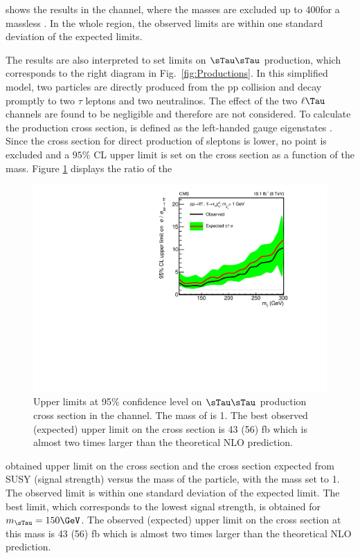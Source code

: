 shows the results in the \tauTau channel, where the \chione masses are excluded up to 400\GeV for a massless \PSGczDo. 
In the whole region, the observed limits are within one standard deviation of the expected limits.  

The results are also interpreted to set limits on $\sTau\sTau$ production, 
which corresponds to the right diagram in Fig.~\ref{fig:Productions}. 
In this simplified model, two \sTau particles are directly produced from the pp  collision and decay promptly to two $\tau$ leptons and two neutralinos. 
The effect of the two $\ell\Tau$ channels are found to be negligible and therefore are not considered.
To calculate the production cross section, \sTau is defined as the left-handed \sTau gauge eigenstates \cite{Fuks:2013lya}. 
Since the cross section for direct production of sleptons is lower, no point is excluded and a $95\%$ CL upper limit is set on 
the cross section  as a function of the \sTau mass. 
Figure \ref{fig:limit_stau_stau} displays the ratio of the 
\begin{linenomath}
\begin{figure}[!htb]
\centering
\includegraphics[width=1.0\textwidth,keepaspectratio=true]{StatisticsFig/ExclusionSTauSTauLsp1.pdf}
\caption{Upper limits at 95\% confidence level on $\sTau\sTau$ production cross section in the \tauTau channel. The mass of \PSGczDo is 1\GeV. 
The best observed (expected) upper limit on the cross section is 43 (56) fb which is almost two  times larger than the theoretical NLO prediction.}
\label{fig:limit_stau_stau}
\end{figure}
\end{linenomath}
obtained upper limit on the cross section and the cross section expected from SUSY (signal strength) versus the mass of the \sTau particle, 
with the \PSGczDo mass set to 1\GeV.
The observed limit is within one standard deviation of  the expected limit.
The best limit, which corresponds to the lowest signal strength, is obtained for $m_{\sTau}=150\GeV$. 
The observed (expected) upper limit on the cross section at this mass is 43 (56) fb which is almost two  times larger than the theoretical NLO prediction.



